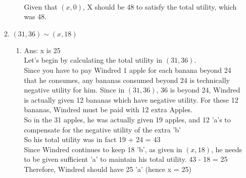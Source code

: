 \documentclass[11pt]{article}
\begin{document}
\begin{enumerate}
\begin{enumerate}
\begin{enumerate}
            \\Given that $(x, 0)$, X should be 48 to satisfy the total utility, which was 48.
        \end{enumerate}
        \item $(31,36)\sim (x,18)$
        \begin{enumerate}
            \item Ans: x is 25
            \\Let's begin by calculating the total utility in $(31,36)$.
            \\Since you have to pay Windred 1 apple for each banana beyond 24 that he consumes, any bananas consumed beyond 24 is technically negative utility for him. Since in $(31,36)$, 36 is beyond 24, Windred is actually given 12 bananas which have negative utility. For these 12 bananas, Windred must be paid with 12 extra Apples.
            \\So in the 31 apples, he was actually given 19 apples, and 12 'a's to compensate for the negative utility of the extra 'b'
            \\So his total utility was in fact 19 + 24 = 43
            \\Since Windred continues to keep 18 'b', as given in $(x,18)$, he needs to be given sufficient 'a' to maintain his total utility. 43 - 18 = 25
            \\Therefore, Windred should have 25 'a' (hence x = 25)
        \end{enumerate}
    \end{enumerate}
    
\pagebreak


\end{enumerate}
\end{document}
